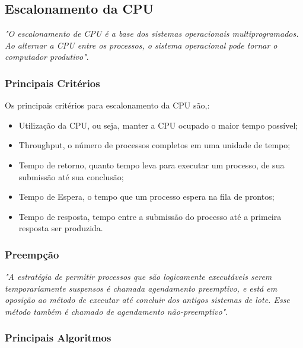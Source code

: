 \subsection{Escalonamento da CPU}


\textit{"O escalonamento de CPU é a base dos sistemas operacionais multiprogramados. Ao alternar a CPU entre os
	processos, o sistema operacional pode tornar o computador produtivo"}. \citep[p.95]{silberschatz2008sistemas}


\subsubsection{Principais Critérios}

Os principais critérios para escalonamento da CPU são,:

\begin{itemize}
	\item Utilização da CPU, ou seja, manter a CPU ocupado o maior tempo possível;
	
	\item Throughput, o número de processos completos em uma unidade de tempo;
	
	\item Tempo de retorno, quanto tempo
	leva para executar um processo, de sua submissão até sua conclusão;
	
	\item Tempo de Espera, o tempo que um processo espera na fila de prontos;
	
	\item Tempo de resposta, tempo entre a submissão do processo até a primeira resposta ser produzida.
\end{itemize}

\subsubsection{Preempção}

\textit{"A estratégia de permitir processos que são logicamente executáveis serem temporariamente suspensos é chamada agendamento preemptivo, e está em oposição ao método de executar até concluir dos antigos sistemas de lote. Esse método também é chamado de agendamento não-preemptivo"}. \citep[p.70]{tanenbaum2009sistemas}


\subsubsection{Principais Algoritmos}

